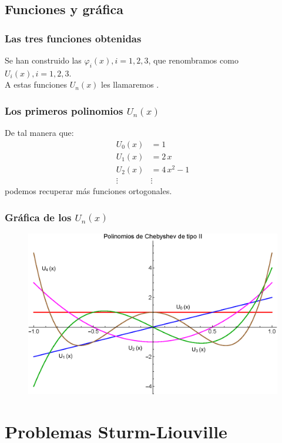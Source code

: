 \documentclass[12pt]{beamer}
\begin{document}
\subsection{Funciones y gráfica}

\begin{frame}
\frametitle{Las tres funciones obtenidas}
Se han construido las $\varphi_{i}(x), i = 1, 2, 3$, que renombramos como $U_{i}(x), i = 1, 2, 3$.
\\
\bigskip
\pause
A estas funciones $U_{n}(x)$ les llamaremos .
\end{frame}
\begin{frame}
\frametitle{Los primeros polinomios $U_{n}(x)$}
De tal manera que:
\pause
\begin{align*}
U_{0} (x) &= 1 \\[0.5em]
U_{1} (x) &= 2 \, x \\[0.5em]
U_{2} (x) &= 4 \, x^{2} - 1 \\[0.5em]
\vdots & \vdots
\end{align*}
podemos recuperar más funciones ortogonales.
\end{frame}
\begin{frame}
\frametitle{Gráfica de los $U_{n}(x)$}
\begin{figure}
    \centering
    \includegraphics[scale=0.62]{Imagenes/Gram_Schmidt_Chebyshev_2.eps}
\end{figure}
\end{frame}

\section{Problemas Sturm-Liouville}
\end{document}
